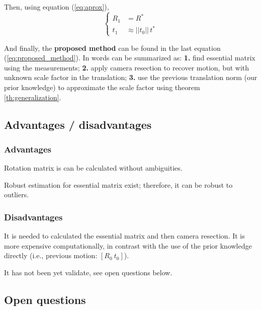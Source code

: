 \noindent
Then, using equation (\ref{eq:aprox}),
\begin{equation}
\label{eq:proposed_method}
\left\{
  \begin{align}
  R_1 & = R^* \\
  t_1 & \approx ||t_0||\,t^*
  \end{align}
\right.
\end{equation}

\noindent
And finally, the \textbf{proposed method} can be found in the last equation (\ref{eq:proposed_method}). In words can be summarized as: \textbf{1.} find essential matrix using the measurements; \textbf{2.} apply camera resection to recover motion, but with unknown scale factor in the translation; \textbf{3.} use the previous translation norm (our prior knowledge) to approximate the scale factor using theorem \ref{th:generalization}.

\subsection{Advantages / disadvantages}
\subsubsection{Advantages}
\begin{itemize*}
 \item Rotation matrix is can be calculated without ambiguities.
 \item Robust estimation for essential matrix exist; therefore, it can be robust to outliers.
\end{itemize*}

\subsubsection{Disadvantages}
\begin{itemize*}
 \item It is needed to calculated the essential matrix and then camera resection. It is more expensive computationally, in contrast with the use of the prior knowledge directly (i.e., previous motion: $[R_0~t_0]$).

 \item It has not been yet validate, see open questions below.
\end{itemize*}



\subsection{Open questions}

